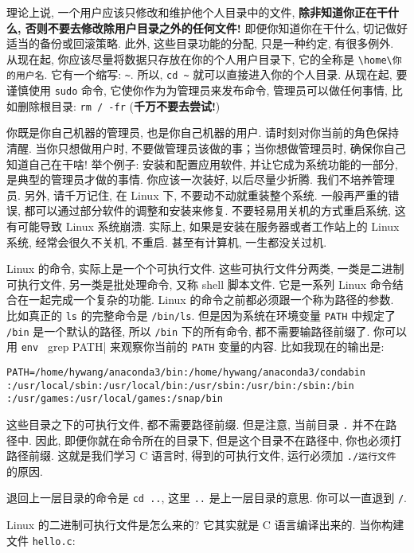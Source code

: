 \documentclass[a4paper]{ctexart}
\begin{document}
理论上说, 一个用户应该只修改和维护他个人目录中的文件, {\bf 除非知道你正在干什么,
  否则不要去修改除用户目录之外的任何文件!} 即便你知道你在干什么, 切记做好适当的备份或回滚策略.
此外, 这些目录功能的分配, 只是一种约定, 有很多例外. 从现在起, 你应该尽量将数据只存放在你的个人用户目录下,
它的全称是 \verb|\home\你的用户名|. 它有一个缩写: \verb|~|. 所以, \verb|cd ~|
就可以直接进入你的个人目录. 从现在起, 要谨慎使用 \verb|sudo| 命令, 它使你作为为管理员来发布命令,
管理员可以做任何事情, 比如删除根目录: \verb|rm / -fr| ({\bf 千万不要去尝试!})

你既是你自己机器的管理员, 也是你自己机器的用户. 请时刻对你当前的角色保持清醒. 当你只想做用户时,
不要做管理员该做的事；当你想做管理员时, 确保你自己知道自己在干啥! 举个例子: 安装和配置应用软件,
并让它成为系统功能的一部分, 是典型的管理员才做的事情. 你应该一次装好, 以后尽量少折腾. 我们不培养管理员.
另外, 请千万记住, 在 Linux 下, 不要动不动就重装整个系统. 一般再严重的错误,
都可以通过部分软件的调整和安装来修复. 不要轻易用关机的方式重启系统, 这有可能导致 Linux 系统崩溃.
实际上, 如果是安装在服务器或者工作站上的 Linux 系统, 经常会很久不关机, 不重启. 甚至有计算机,
一生都没关过机. 

Linux 的命令, 实际上是一个个可执行文件. 这些可执行文件分两类, 一类是二进制可执行文件,
另一类是批处理命令, 又称 shell 脚本文件. 它是一系列 Linux 命令结合在一起完成一个复杂的功能. 
Linux 的命令之前都必须跟一个称为路径的参数. 比如真正的 \verb|ls| 的完整命令是
\verb|/bin/ls|. 但是因为系统在环境变量 \verb|PATH| 中规定了 \verb|/bin| 是一个默认的路径,
所以 \verb|/bin| 下的所有命令, 都不需要输路径前缀了. 你可以用 \verb|env | grep PATH|
来观察你当前的 \verb|PATH| 变量的内容. 比如我现在的输出是:

\begin{verbatim}
PATH=/home/hywang/anaconda3/bin:/home/hywang/anaconda3/condabin
:/usr/local/sbin:/usr/local/bin:/usr/sbin:/usr/bin:/sbin:/bin
:/usr/games:/usr/local/games:/snap/bin
\end{verbatim}

这些目录之下的可执行文件, 都不需要路径前缀. 但是注意, 当前目录 \verb|.| 并不在路径中. 因此,
即便你就在命令所在的目录下, 但是这个目录不在路径中, 你也必须打路径前缀. 这就是我们学习 C 语言时,
得到的可执行文件, 运行必须加 \verb|./运行文件| 的原因.


退回上一层目录的命令是 \verb|cd ..|, 这里 \verb|..| 是上一层目录的意思.
你可以一直退到 \verb|/|.

Linux 的二进制可执行文件是怎么来的? 它其实就是 C 语言编译出来的. 当你构建文件 \verb|hello.c|:
\end{document}
